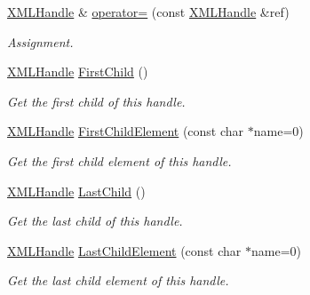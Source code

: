 \begin{DoxyCompactItemize}
\hyperlink{classtinyxml2_1_1_x_m_l_handle}{X\+M\+L\+Handle} \& \hyperlink{classtinyxml2_1_1_x_m_l_handle_a75b908322bb4b83be3281b6845252b20}{operator=} (const \hyperlink{classtinyxml2_1_1_x_m_l_handle}{X\+M\+L\+Handle} \&ref)
\begin{DoxyCompactList}\small\item\em Assignment. \end{DoxyCompactList}\item 
\mbox{\label{classtinyxml2_1_1_x_m_l_handle_a536447dc7f54c0cd11e031dad94795ae}} 
\hyperlink{classtinyxml2_1_1_x_m_l_handle}{X\+M\+L\+Handle} \hyperlink{classtinyxml2_1_1_x_m_l_handle_a536447dc7f54c0cd11e031dad94795ae}{First\+Child} ()
\begin{DoxyCompactList}\small\item\em Get the first child of this handle. \end{DoxyCompactList}\item 
\mbox{\label{classtinyxml2_1_1_x_m_l_handle_a74b04dd0f15e0bf01860e282b840b6a3}} 
\hyperlink{classtinyxml2_1_1_x_m_l_handle}{X\+M\+L\+Handle} \hyperlink{classtinyxml2_1_1_x_m_l_handle_a74b04dd0f15e0bf01860e282b840b6a3}{First\+Child\+Element} (const char $\ast$name=0)
\begin{DoxyCompactList}\small\item\em Get the first child element of this handle. \end{DoxyCompactList}\item 
\mbox{\label{classtinyxml2_1_1_x_m_l_handle_a9d09f04435f0f2f7d0816b0198d0517b}} 
\hyperlink{classtinyxml2_1_1_x_m_l_handle}{X\+M\+L\+Handle} \hyperlink{classtinyxml2_1_1_x_m_l_handle_a9d09f04435f0f2f7d0816b0198d0517b}{Last\+Child} ()
\begin{DoxyCompactList}\small\item\em Get the last child of this handle. \end{DoxyCompactList}\item 
\mbox{\label{classtinyxml2_1_1_x_m_l_handle_a42cccd0ce8b1ce704f431025e9f19e0c}} 
\hyperlink{classtinyxml2_1_1_x_m_l_handle}{X\+M\+L\+Handle} \hyperlink{classtinyxml2_1_1_x_m_l_handle_a42cccd0ce8b1ce704f431025e9f19e0c}{Last\+Child\+Element} (const char $\ast$name=0)
\begin{DoxyCompactList}\small\item\em Get the last child element of this handle. \end{DoxyCompactList}\item 

\end{DoxyCompactItemize}
